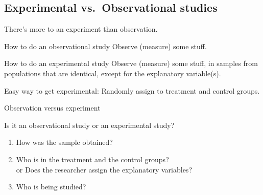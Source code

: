 \subsection{Experimental vs.\ Observational studies}

\begin{frame}{There's more to an experiment than observation.}

  \begin{block}{How to do an observational study}
    \alert{Observe} (measure) some stuff.
  \end{block}

  \vspace{2em}

  \begin{block}{How to do an experimental study}
    Observe (measure) some stuff, 
    in samples from populations that are identical,
    except for the explanatory variable(s).
  \end{block}

  \vspace{2em}

  \alert{Easy way to get experimental:}
  Randomly assign to treatment and control groups.

\end{frame}

%
\begin{frame}{Observation versus experiment}

  Is it an observational study or an experimental study?
  \begin{enumerate}

    \item How was the sample obtained?

    \item Who is in the treatment and the control groups? \\
      \alert{or} Does the researcher assign the explanatory variables?

    \item Who is being studied?

  \end{enumerate}

\end{frame}

%


